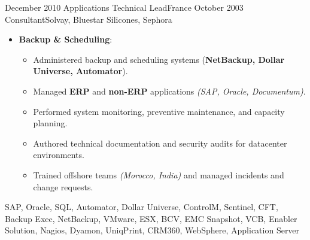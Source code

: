 \begin{experiences}
\emptySeparator

\consultantexperience
    {December 2010} {Applications Technical Lead}{}{France}
    {October 2003}    {Consultant}{Solvay, Bluestar Silicones, Sephora} {
        \begin{itemize}[left=0pt,label={},itemsep=0.5em]

          \item \textbf{Backup \& Scheduling}:
            \begin{itemize}[itemsep=0.2em,topsep=0.2em,parsep=0pt]
              \small
              \item Administered backup and scheduling systems (\textbf{NetBackup, Dollar Universe, Automator}).
              \item Managed \textbf{ERP} and \textbf{non-ERP} applications \emph{(SAP, Oracle, Documentum)}.
              \item Performed system monitoring, preventive maintenance, and capacity planning.
              \item Authored technical documentation and security audits for datacenter environments.
              \item Trained offshore teams \emph{(Morocco, India)} and managed incidents and change requests.
            \end{itemize}

        \end{itemize}
    }
         \vspace{0.5em}   %
    {SAP, Oracle, SQL, Automator, Dollar Universe, ControlM, Sentinel, CFT, Backup Exec, NetBackup, VMware, ESX, BCV, EMC Snapshot, VCB, Enabler Solution, Nagios, Dyamon, UniqPrint, CRM360, WebSphere, Application Server}

\emptySeparator
\end{experiences}
